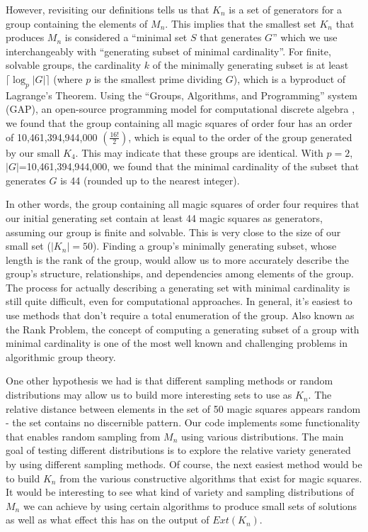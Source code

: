\documentclass[12pt]{report}
\begin{document}
\par However, revisiting our definitions tells us that $K_n$ is a set of generators for a group
containing the elements of $M_n$. This implies that the smallest set $K_n$ that produces $M_n$ is
considered a ``minimal set $S$ that generates $G$'' which we  use interchangeably with ``generating
subset of minimal cardinality''. For finite, solvable groups, the cardinality $k$ of the minimally
generating subset is at least $\lceil\log_{p}{\left|G\right|}\rceil$ (where $p$ is the smallest
prime dividing $G$), which is a byproduct of Lagrange's Theorem. Using the ``Groups, Algorithms,
and Programming'' system (GAP), an open-source programming model for computational discrete algebra
, we found that the group containing all magic squares of order four has an order of
10,461,394,944,000 $\left(\frac{16!}{2}\right)$, which is equal to the order of the group generated 
by our small $K_4$. This may
indicate that these groups are identical. With $p=2$, $\left|G\right|$=10,461,394,944,000, we found
that the minimal cardinality of the subset that generates $G$ is 44 (rounded up to the nearest
integer).

\par In other words, the group containing all magic squares of order four requires that our initial
generating set contain at least 44 magic squares as generators, assuming our group is finite and
solvable. This is very close to the size of our small set ($\left|K_n\right|=50$). Finding a
group's minimally generating subset, whose length is the rank of the group, would allow us to more
accurately describe the group's structure, relationships, and dependencies among elements of the
group. The process for actually describing a generating set with minimal cardinality is still quite
difficult, even for computational approaches. In general, it's easiest to use methods that don't
require a total enumeration of the group. Also known as the Rank Problem, the concept of computing
a generating subset of a group with minimal cardinality is one of the most well known and
challenging problems in algorithmic group theory.

\par One other hypothesis we had is that different sampling methods or random distributions may
allow us to build more interesting sets to use as $K_n$. The relative distance between elements in
the set of 50 magic squares appears random \hyphen{} the set contains no discernible pattern. Our
code implements some functionality that enables random sampling from $M_n$ using various
distributions. The main goal of testing different distributions is to explore the relative variety
generated by using different sampling methods. Of course, the next easiest method would be to build
$K_n$ from the various constructive algorithms that exist for magic squares. It would be
interesting to see what kind of variety and sampling distributions of $M_n$ we can achieve by using
certain algorithms to produce small sets of solutions as well as what effect this has on the output
of $Ext\left(K_n\right)$.
\end{document}
